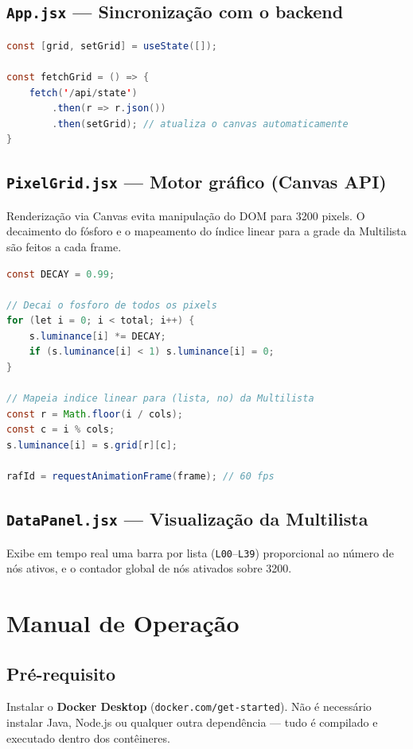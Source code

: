 \documentclass[12pt, a4paper]{article}
\begin{document}
\subsection{\texttt{App.jsx} — Sincronização com o backend}
\begin{lstlisting}[language=Java]
const [grid, setGrid] = useState([]);

const fetchGrid = () => {
    fetch('/api/state')
        .then(r => r.json())
        .then(setGrid); // atualiza o canvas automaticamente
}
\end{lstlisting}

\subsection{\texttt{PixelGrid.jsx} — Motor gráfico (Canvas API)}
Renderização via Canvas evita manipulação do DOM para 3200 pixels. O decaimento do fósforo e o mapeamento do índice linear para a grade da Multilista são feitos a cada frame.
\begin{lstlisting}[language=Java]
const DECAY = 0.99;

// Decai o fosforo de todos os pixels
for (let i = 0; i < total; i++) {
    s.luminance[i] *= DECAY;
    if (s.luminance[i] < 1) s.luminance[i] = 0;
}

// Mapeia indice linear para (lista, no) da Multilista
const r = Math.floor(i / cols);
const c = i % cols;
s.luminance[i] = s.grid[r][c];

rafId = requestAnimationFrame(frame); // 60 fps
\end{lstlisting}

\subsection{\texttt{DataPanel.jsx} — Visualização da Multilista}
Exibe em tempo real uma barra por lista (\texttt{L00}–\texttt{L39}) proporcional ao número de nós ativos, e o contador global de nós ativados sobre 3200.

\section{Manual de Operação}

\subsection{Pré-requisito}
Instalar o \textbf{Docker Desktop} (\texttt{docker.com/get-started}). Não é necessário instalar Java, Node.js ou qualquer outra dependência — tudo é compilado e executado dentro dos contêineres.
\end{document}

